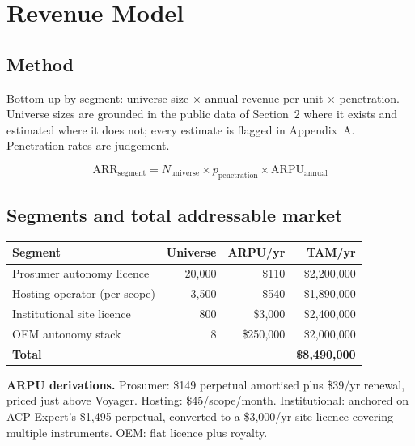 \documentclass[11pt]{article}
\newcommand{\dollar}[1]{\$#1}
\begin{document}
\section{Revenue Model}

\subsection{Method}

Bottom-up by segment: universe size $\times$ annual revenue per unit $\times$
penetration. Universe sizes are grounded in the public data of Section~2 where
it exists and estimated where it does not; every estimate is flagged in
Appendix~A. Penetration rates are judgement.

\[
\text{ARR}_{\text{segment}} = N_{\text{universe}} \times p_{\text{penetration}} \times \text{ARPU}_{\text{annual}}
\]

\subsection{Segments and total addressable market}

\begin{center}
\small
\begin{tabular}{@{}lrrr@{}}
\toprule
\textbf{Segment} & \textbf{Universe} & \textbf{ARPU/yr} & \textbf{TAM/yr} \\
\midrule
Prosumer autonomy licence & 20{,}000 & \dollar{110} & \dollar{2{,}200{,}000} \\
Hosting operator (per scope) & 3{,}500 & \dollar{540} & \dollar{1{,}890{,}000} \\
Institutional site licence & 800 & \dollar{3{,}000} & \dollar{2{,}400{,}000} \\
OEM autonomy stack & 8 & \dollar{250{,}000} & \dollar{2{,}000{,}000} \\
\midrule
\textbf{Total} & & & \textbf{\dollar{8{,}490{,}000}} \\
\bottomrule
\end{tabular}
\end{center}

\vspace{0.3em}
\noindent\textbf{ARPU derivations.} Prosumer: \dollar{149} perpetual amortised
plus \dollar{39}/yr renewal, priced just above Voyager. Hosting:
\dollar{45}/scope/month. Institutional: anchored on ACP Expert's \dollar{1{,}495}
perpetual, converted to a \dollar{3{,}000}/yr site licence covering multiple
instruments. OEM: flat licence plus royalty.
\end{document}
